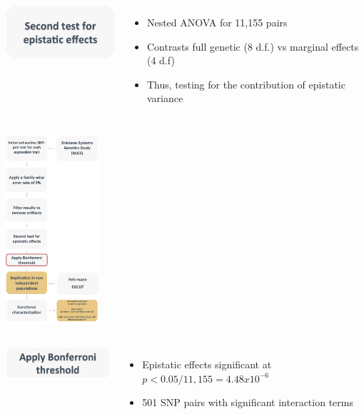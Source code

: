 \documentclass{beamer}
\begin{document}
\begin{frame}
\begin{columns}[c]
\includegraphics[width=4.5cm]{images/second.png} \\
\begin{itemize}
\item Nested ANOVA for 11,155 pairs 
\vspace{0.2cm} 
\item Contrasts full genetic (8 d.f.) vs marginal effects (4 d.f)
\vspace{0.2cm} 
\item Thus, testing for the contribution of epistatic variance 
\end{itemize}
\end{columns}
\end{frame}

\begin{frame}
\begin{center}
\includegraphics[height=7cm]{images/methods7.png} \\
\end{center}
\end{frame}

\begin{frame}
\begin{columns}[c]
\includegraphics[width=4.5cm]{images/bonf.png} \\
\begin{itemize}
\item Epistatic effects significant at $p < 0.05/11,155 = 4.48x10^{-6}$
\vspace{0.2cm} 
\item 501 SNP pairs with significant interaction terms 
\end{itemize}
\end{columns}
\end{frame}
\end{document}
